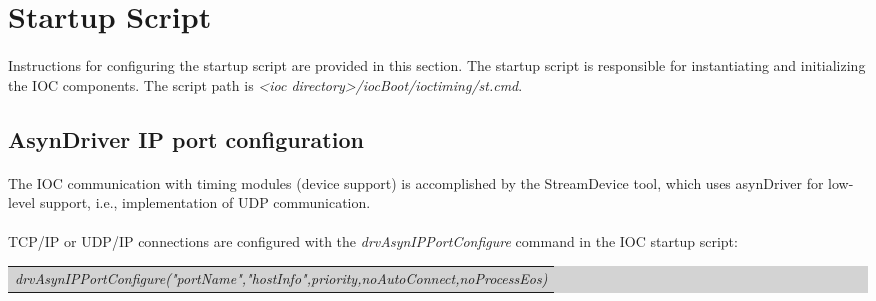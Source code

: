 \documentclass[openany]{article}
\begin{document}
\section{Startup Script}\label{sec:startup-script}

	\paragraph{} Instructions for configuring the startup script are provided in this section. The startup script is responsible for instantiating and initializing the IOC components. The script path is \emph{\textless ioc directory\textgreater /iocBoot/ioctiming/st.cmd}.

	\subsection{AsynDriver IP port configuration}\label{sec:ip-port-config}

		\paragraph{} The IOC communication with timing modules (device support) is accomplished by the StreamDevice tool, which uses asynDriver for low-level support, i.e., implementation of UDP communication.
		\paragraph{} TCP/IP or UDP/IP connections are configured with the \emph{drvAsynIPPortConfigure} command in the IOC startup script:

		\bigskip
		\colorbox{lightgray}{
			\begin{tabularx}{0.9\textwidth}{X}
			\emph{drvAsynIPPortConfigure("portName","hostInfo",priority,noAutoConnect,noProcessEos)}
			\end{tabularx}
		}
\end{document}
